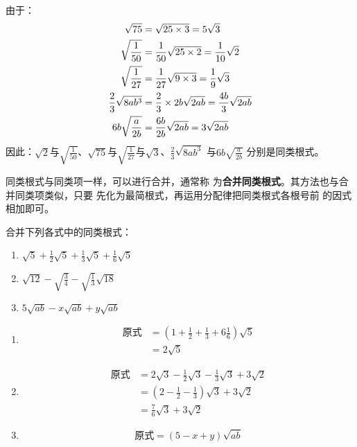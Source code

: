\begin{solution}
由于：
\[\begin{split}
    \sqrt{75}&=\sqrt{25\times 3}=5\sqrt{3}\\
    \sqrt{\dfrac{1}{50}}&=\dfrac{1}{50}\sqrt{25\times 2}=\dfrac{1}{10}\sqrt{2}    \\
    \sqrt{\dfrac{1}{27}}&=\dfrac{1}{27}\sqrt{9\times 3}=\dfrac{1}{9}\sqrt{3}    \\
    \dfrac{2}{3}\sqrt{8ab^3}&=\dfrac{2}{3}\times 2b\sqrt{2ab}=\dfrac{4b}{3}\sqrt{2ab}    \\
    6b\sqrt{\dfrac{a}{2b}}&=\dfrac{6b}{2b}\sqrt{2ab}=3\sqrt{2ab}    \\
\end{split}\]
因此：$\sqrt{2}$与$\sqrt{\frac{1}{50}}$、$\sqrt{75}$与$\sqrt{\frac{1}{27}}$与$\sqrt{3}$、$\frac{2}{3}\sqrt{8ab^3}$
与$6b\sqrt{\frac{a}{2b}}$ 分别是同类根式。 
\end{solution}

同类根式与同类项一样，可以进行合并，通常称
为\textbf{合并同类根式}。其方法也与合并同类项类似，只要
先化为最简根式，再运用分配律把同类根式各根号前
的因式相加即可。

\begin{example}
    合并下列各式中的同类根式：
\begin{enumerate}
    \item $\sqrt{5}+\frac{1}{2}\sqrt{5}+\frac{1}{3}\sqrt{5}+\frac{1}{6}\sqrt{5}$
    \item $\sqrt{12}-\sqrt{\frac{3}{4}}-\sqrt{\frac{1}{3}}\sqrt{18}$
    \item $5\sqrt{ab}-x\sqrt{ab}+y\sqrt{ab}$
\end{enumerate}
\end{example}

\begin{solution}
\begin{enumerate}
    \item \[\begin{split}
        \text{原式}&=\left(1+\frac{1}{2}+\frac{1}{3}+6\frac{1}{6}\right)\sqrt{5}\\
        &=2\sqrt{5}
    \end{split}\]
    \item \[\begin{split}
        \text{原式}&=2\sqrt{3}-\frac{1}{2}\sqrt{3}-\frac{1}{3}\sqrt{3}+3\sqrt{2}\\
        &=\left(2-\frac{1}{2}-\frac{1}{3}\right)\sqrt{3}+3\sqrt{2}\\
        &=\frac{7}{6}\sqrt{3}+3\sqrt{2}
    \end{split}\]
    \item  \[\text{原式}=(5-x+y)\sqrt{ab}\]
\end{enumerate}
\end{solution}

